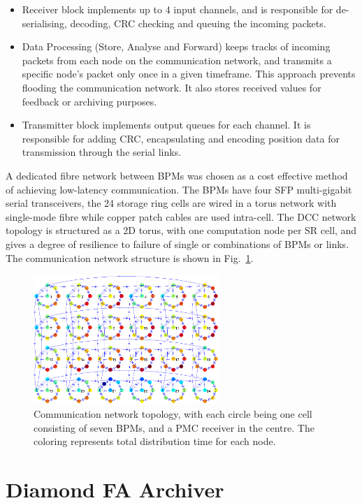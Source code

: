 \documentclass[a4paper,
              ]{jacow}
\begin{document}
\begin{itemize}
\setlength\itemsep{0em}
\item Receiver block implements up to 4 input channels, and is responsible for de-serialising, decoding, CRC checking and queuing the incoming packets.
\item Data Processing (Store, Analyse and Forward) keeps tracks of incoming packets from each node on the communication network, and transmits a specific node's packet only once in a given timeframe. This approach prevents flooding the communication network. It also stores received values for feedback or archiving purposes.
\item Transmitter block implements output queues for each channel. It is responsible for adding CRC, encapsulating and encoding position data for transmission through the serial links.
\end{itemize}

A dedicated fibre network between BPMs was chosen as a cost effective method of achieving low-latency communication. The BPMs have four SFP multi-gigabit serial transceivers, the 24 storage ring cells are wired in a torus network with single-mode fibre while copper patch cables are used intra-cell. The DCC network topology is structured as a 2D torus, with one computation node per SR cell, and gives a degree of resilience to failure of single or combinations of BPMs or links. The communication network structure is shown in Fig.~\ref{NETWORK}.

\begin{figure}[b!]
   \centering
   \includegraphics[width=70mm]{img/WEPGF089f2}
   \caption{Communication network topology, with each circle being one cell consisting of seven BPMs, and a PMC receiver in the centre. The coloring represents total distribution time for each node.}
   \label{NETWORK}
\end{figure}

\section{Diamond FA Archiver}
\end{document}
